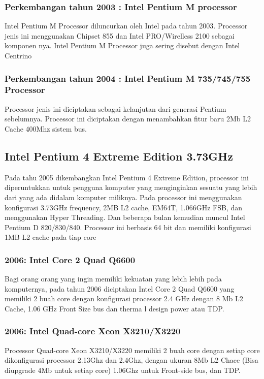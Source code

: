  			\subsubsection{Perkembangan tahun 2003 : Intel Pentium M processor}
 	Intel Pentium M Processor diluncurkan oleh Intel pada tahun 2003. Processor jenis ini menggunakan Chipset 855 dan Intel PRO/Wirelless 2100 sebagai komponen nya. Intel Pentium M Processor juga sering disebut dengan Intel Centrino
 			\subsubsection{Perkembangan tahun 2004 : Intel Pentium M 735/745/755 Processor}
 	Processor jenis ini diciptakan sebagai kelanjutan dari generasi Pentium sebelumnya. Processor ini diciptakan dengan menambahkan fitur baru 2Mb L2 Cache 400Mhz sistem bus.


 			\subsection{Intel Pentium 4 Extreme Edition 3.73GHz}
 	Pada tahu 2005 dikembangkan Intel Pentium 4 Extreme Edition, processor ini diperuntukkan untuk pengguna komputer yang menginginkan sesuatu yang lebih dari yang ada didalam komputer miliknya. Pada processor ini menggunakan konfigurasi  3.73GHz frequency, 2MB L2 cache, EM64T, 1.066GHz FSB, dan menggunakan Hyper Threading. Dan beberapa bulan kemudian muncul Intel Pentium D 820/830/840. Processor ini berbasis 64 bit dan memiliki konfigurasi 1MB L2 cache pada tiap core

	
			\subsubsection{2006: Intel Core 2 Quad Q6600}
 	Bagi orang orang yang ingin memiliki kekuatan yang lebih lebih pada komputernya, pada tahun 2006 diciptakan Intel Core 2 Quad Q6600 yang memiliki 2 buah core dengan konfigurasi processor 2.4 GHz dengan 8 Mb L2 Cache, 1.06 GHz Front Size bus dan therma l design power atau TDP.
 			\subsubsection{2006: Intel Quad-core Xeon X3210/X3220}
 	Processor Quad-core Xeon X3210/X3220 memiliki 2 buah core dengan setiap core dikonfigurasi processor 2.13Ghz dan 2.4Ghz, dengan ukuran 8Mb L2 Chace (Bisa diupgrade 4Mb untuk setiap core) 1.06Ghz untuk Front-side bus, dan TDP.


